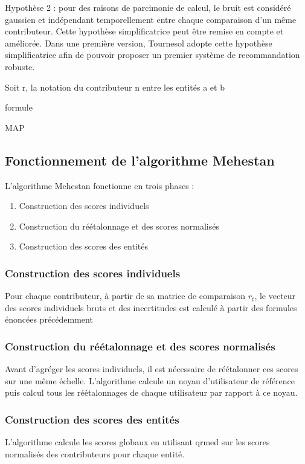 Hypothèse 2 : pour des raisons de parcimonie de calcul, le bruit est considéré gaussien et indépendant temporellement entre chaque comparaison d'un même contributeur. Cette hypothèse simplificatrice peut être remise en compte et améliorée. Dans une première version, Tournesol adopte cette hypothèse simplificatrice afin de pouvoir proposer un premier système de recommandation robuste.

Soit r, la notation du contributeur n entre les entités a et b

formule

MAP

\subsection{Fonctionnement de l'algorithme Mehestan}

L'algorithme Mehestan fonctionne en trois phases :

\begin{enumerate}
    \item Construction des scores individuels
    \item Construction du réétalonnage et des scores normalisés
    \item Construction des scores des entités
\end{enumerate}
\subsubsection{Construction des scores individuels}

Pour chaque contributeur, à partir de sa matrice de comparaison $r_t$, le vecteur des scores individuels bruts et des incertitudes est calculé à partir des formules énoncées précédemment

\subsubsection{Construction du réétalonnage et des scores normalisés}

Avant d'agréger les scores individuels, il est nécessaire de réétalonner ces scores sur une même échelle. L'algorithme calcule un noyau d'utilisateur de référence puis calcul tous les réétalonnages de chaque utilisateur par rapport à ce noyau. 

\subsubsection{Construction des scores des entités}

L'algorithme calcule les scores globaux en utilisant \gls{qrmed} sur les scores normalisés des contributeurs pour chaque entité.


\pagebreak

